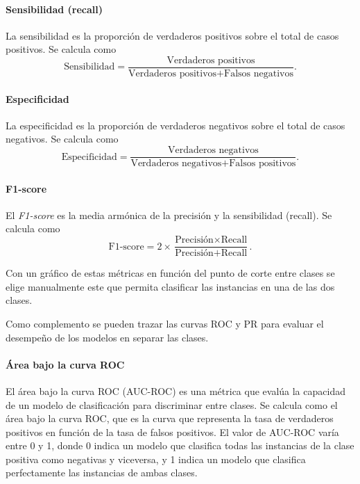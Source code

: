 \documentclass[a4paper]{report}
\begin{document}
\paragraph{Sensibilidad (recall)}
La sensibilidad es la proporción de verdaderos positivos sobre el total de casos positivos.
Se calcula como
\begin{equation}
	\text{Sensibilidad} = \frac{\text{Verdaderos positivos}}{\text{Verdaderos positivos} + \text{Falsos negativos}}.
\end{equation}

\paragraph{Especificidad}
La especificidad es la proporción de verdaderos negativos sobre el total de casos negativos.
Se calcula como
\begin{equation}
	\text{Especificidad} = \frac{\text{Verdaderos negativos}}{\text{Verdaderos negativos} + \text{Falsos positivos}}.
\end{equation}

\paragraph{F1-score}
El \emph{F1-score} es la media armónica de la precisión y la sensibilidad (recall).
Se calcula como
\begin{equation}
	\text{F1-score} = 2 \times \frac{\text{Precisión} \times \text{Recall}}{\text{Precisión} + \text{Recall}}.
\end{equation}

Con un gráfico de estas métricas en función del punto de corte entre clases se elige manualmente este que permita clasificar las instancias en una de las dos clases.

Como complemento se pueden trazar las curvas ROC y PR para evaluar el desempeño de los modelos en separar las clases.

\paragraph{Área bajo la curva ROC}
El área bajo la curva ROC (AUC-ROC) es una métrica que evalúa la capacidad de un modelo de clasificación para discriminar entre clases.
Se calcula como el área bajo la curva ROC, que es la curva que representa la tasa de verdaderos positivos en función de la tasa de falsos positivos.
El valor de AUC-ROC varía entre 0 y 1, donde 0 indica un modelo que clasifica todas las instancias de la clase positiva como negativas y viceversa, y 1 indica un modelo que clasifica perfectamente las instancias de ambas clases.
\end{document}
